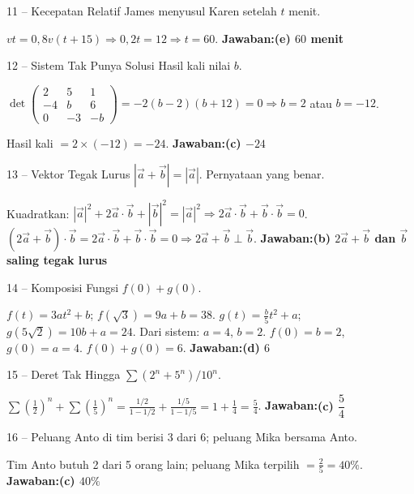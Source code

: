 \documentclass[11pt]{article}
\newcommand{\jawaban}[1]{\textbf{Jawaban:}\enspace\colorbox{gold!30}{\textbf{#1}}}
\begin{document}
\begin{soal}{11 -- Kecepatan Relatif}
James menyusul Karen setelah $t$ menit.
\end{soal}
\begin{pembox}
$vt=0{,}8v(t+15)\Rightarrow0{,}2t=12\Rightarrow t=60$.
\jawaban{(e) $60$ menit}
\end{pembox}

\begin{soal}{12 -- Sistem Tak Punya Solusi}
Hasil kali nilai $b$.
\end{soal}
\begin{pembox}
$\det\begin{pmatrix}2&5&1\\-4&b&6\\0&-3&-b\end{pmatrix}=-2(b-2)(b+12)=0\Rightarrow b=2$ atau $b=-12$.

Hasil kali $=2\times(-12)=-24$.
\jawaban{(c) $-24$}
\end{pembox}

\begin{soal}{13 -- Vektor Tegak Lurus}
$|\vec a+\vec b|=|\vec a|$. Pernyataan yang benar.
\end{soal}
\begin{pembox}
Kuadratkan: $|\vec a|^2+2\vec a\cdot\vec b+|\vec b|^2=|\vec a|^2\Rightarrow2\vec a\cdot\vec b+\vec b\cdot\vec b=0$.
$(2\vec a+\vec b)\cdot\vec b=2\vec a\cdot\vec b+\vec b\cdot\vec b=0\Rightarrow2\vec a+\vec b\perp\vec b$.
\jawaban{(b) $2\vec a+\vec b$ dan $\vec b$ saling tegak lurus}
\end{pembox}

\begin{soal}{14 -- Komposisi Fungsi}
$f(0)+g(0)$.
\end{soal}
\begin{pembox}
$f(t)=3at^2+b$; $f(\sqrt3)=9a+b=38$. $g(t)=\frac{b}{5}t^2+a$; $g(5\sqrt2)=10b+a=24$.
Dari sistem: $a=4$, $b=2$. $f(0)=b=2$, $g(0)=a=4$. $f(0)+g(0)=6$.
\jawaban{(d) $6$}
\end{pembox}

\begin{soal}{15 -- Deret Tak Hingga}
$\sum(2^n+5^n)/10^n$.
\end{soal}
\begin{pembox}
$\sum(\frac12)^n+\sum(\frac15)^n=\frac{1/2}{1-1/2}+\frac{1/5}{1-1/5}=1+\frac14=\frac54$.
\jawaban{(c) $\dfrac54$}
\end{pembox}

\begin{soal}{16 -- Peluang}
Anto di tim berisi 3 dari 6; peluang Mika bersama Anto.
\end{soal}
\begin{pembox}
Tim Anto butuh 2 dari 5 orang lain; peluang Mika terpilih $=\frac25=40\%$.
\jawaban{(c) $40\%$}
\end{pembox}
\end{document}
